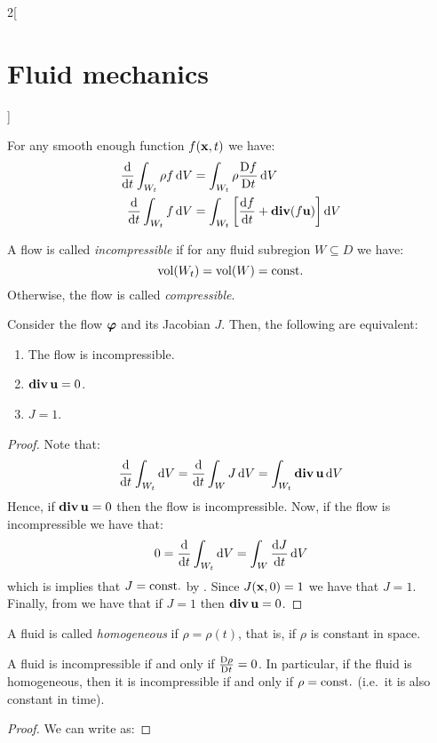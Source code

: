 \documentclass[../../../main_physics.tex]{subfiles}
\begin{document}
\begin{multicols}{2}[\section{Fluid mechanics}]
\begin{corollary}
    For any smooth enough function $f(\boldsymbol{\mathrm{x}},t)$ we have:
    \begin{align*}
      \dv{}{t}\int_{W_t}\rho f\dd{V} & =\int_{W_t}\rho\frac{\mathrm{D}f}{\mathrm{D}t}\dd{V}                     \\
      \dv{}{t}\int_{W_t} f\dd{V}     & =\int_{W_t}\left[\dv{f}{t}+\operatorname{\boldsymbol{\mathrm{div}}}(f\boldsymbol{\mathrm{u}})\right]\dd{V} \\
    \end{align*}
  \end{corollary}
  \begin{definition}
    A flow is called \emph{incompressible} if for any fluid subregion $W\subseteq D$ we have:
    $$
      \operatorname{vol}(W_t)=\operatorname{vol}(W)=\text{const.}
    $$
    Otherwise, the flow is called \emph{compressible}.
  \end{definition}
  \begin{proposition}\label{FLM:incompressible_eq}
    Consider the flow $\boldsymbol{\mathrm{\varphi}}$ and its Jacobian $J$. Then, the following are equivalent:
    \begin{enumerate}
      \item The flow is incompressible.
      \item $\operatorname{\boldsymbol{\mathrm{div}}}\boldsymbol{\mathrm{u}}=0$.
      \item $J=1$.
    \end{enumerate}
  \end{proposition}
  \begin{proof}
    Note that:
    $$
      \dv{}{t}\int_{W_t}\dd{V}=\dv{}{t}\int_WJ\dd{V}=\int_{W_t}\operatorname{\boldsymbol{\mathrm{div}}}\boldsymbol{\mathrm{u}}\dd{V}
    $$
    Hence, if $\operatorname{\boldsymbol{\mathrm{div}}} \boldsymbol{\mathrm{u}}=0$ then the flow is incompressible. Now, if the flow is incompressible we have that:
    $$
      0=\dv{}{t}\int_{W_t}\dd{V}=\int_W\dv{J}{t}\dd{V}
    $$
    which is implies that $J=\text{const.}$ by . Since $J(\boldsymbol{\mathrm{x}},0)=1$ we have that $J=1$. Finally, from  we have that if $J=1$ then $\operatorname{\boldsymbol{\mathrm{div}}}\boldsymbol{\mathrm{u}}=0$.
  \end{proof}
  \begin{definition}
    A fluid is called \emph{homogeneous} if $\rho=\rho(t)$, that is, if $\rho$ is constant in space.
  \end{definition}
  \begin{proposition}
    A fluid is incompressible if and only if $\frac{\mathrm{D}\rho}{\mathrm{D}t}=0$. In particular, if the fluid is homogeneous, then it is incompressible if and only if $\rho=\text{const.}$ (i.e.\ it is also constant in time).
  \end{proposition}
  \begin{proof}
    We can write  as:

\end{proof}
\end{multicols}
\end{document}
